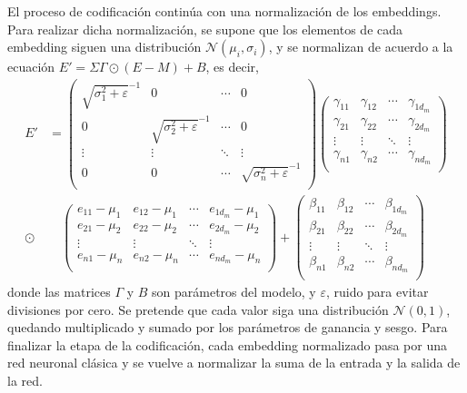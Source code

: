 				El proceso de codificación continúa con una normalización de los embeddings. Para realizar dicha normalización\cite{normalization}, se supone que los elementos de cada embedding siguen una distribución $\mathcal{N}(\mu_i, \sigma_i)$, y se normalizan de acuerdo a la ecuación $E' = \Sigma\Gamma\odot(E - M) + B$, es decir, 
				\begin{align*}
					E' &= \begin{pmatrix}
						\sqrt{\sigma^2_1 + \varepsilon}^{-1} & 0 & \cdots & 0\\
						0 & \sqrt{\sigma^2_2 + \varepsilon}^{-1} & \cdots & 0\\
						\vdots & \vdots & \ddots & \vdots\\
						0 & 0 & \cdots & \sqrt{\sigma^2_n + \varepsilon}^{-1}\\
					\end{pmatrix}
					\begin{pmatrix}
						\gamma_{11} & \gamma_{12} & \cdots & \gamma_{1d_m}\\
						\gamma_{21} & \gamma_{22} & \cdots & \gamma_{2d_m}\\
						\vdots & \vdots & \ddots & \vdots\\
						\gamma_{n1} & \gamma_{n2} & \cdots & \gamma_{nd_m}\\
					\end{pmatrix} \\
					\odot&\quad \begin{pmatrix}
						e_{11} - \mu_1 & e_{12} - \mu_1 & \cdots & e_{1d_m} - \mu_1\\
						e_{21} - \mu_2 & e_{22} - \mu_2 & \cdots & e_{2d_m} - \mu_2\\
						\vdots & \vdots & \ddots & \vdots\\
						e_{n1} - \mu_n & e_{n2} - \mu_n & \cdots & e_{nd_m} - \mu_n\\
					\end{pmatrix} + \begin{pmatrix}
						\beta_{11} & \beta_{12} & \cdots & \beta_{1d_m}\\
						\beta_{21} & \beta_{22} & \cdots & \beta_{2d_m}\\
						\vdots & \vdots & \ddots & \vdots\\
						\beta_{n1} & \beta_{n2} & \cdots & \beta_{nd_m}\\
					\end{pmatrix}
				\end{align*}
				donde las matrices $\Gamma$ y $B$ son parámetros del modelo, y $\varepsilon$, ruido para evitar divisiones por cero. Se pretende que cada valor siga una distribución $\mathcal{N}(0, 1)$, quedando multiplicado y sumado por los parámetros de ganancia y sesgo. Para finalizar la etapa de la codificación, cada embedding normalizado pasa por una red neuronal clásica y se vuelve a normalizar la suma de la entrada y la salida de la red. 
				
